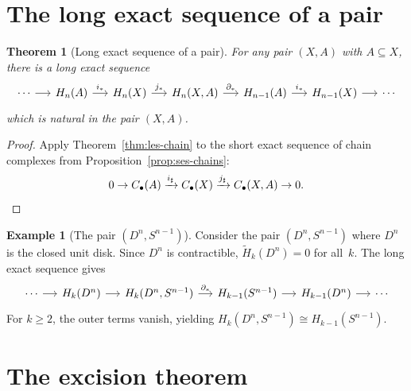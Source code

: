 \documentclass[12pt,a4paper,openany]{book}
\theoremstyle{definition}
\newtheorem{example}[definition]{Example}
\theoremstyle{plain}
\newtheorem{theorem}[definition]{Theorem}
\theoremstyle{remark}
\begin{document}
\section{The long exact sequence of a pair}\label{sec:les-pair}

\begin{theorem}[Long exact sequence of a pair]\label{thm:les-pair}
For any pair $(X,A)$ with $A\subseteq X$, there is a long exact sequence
\[
\begin{tikzcd}[column sep=1.4em]
  \cdots \ar[r]
  & H_n(A) \ar[r,"i_*"]
  & H_n(X) \ar[r,"j_*"]
  & H_n(X,A) \ar[r,"\partial_*"]
  & H_{n-1}(A) \ar[r,"i_*"]
  & H_{n-1}(X) \ar[r]
  & \cdots
\end{tikzcd}
\]
which is natural in the pair $(X,A)$.
\end{theorem}

\begin{proof}
Apply Theorem~\ref{thm:les-chain} to the short exact sequence of
chain complexes from Proposition~\ref{prop:ses-chains}:
\[
  0\to C_\bullet(A)\xrightarrow{i_\sharp}
  C_\bullet(X)\xrightarrow{j_\sharp}
  C_\bullet(X,A)\to 0. \qedhere
\]
\end{proof}

\begin{example}[The pair $(D^n,S^{n-1})$]\label{ex:pair-disk-sphere}
Consider the pair $(D^n,S^{n-1})$ where $D^n$ is the closed unit disk.
Since $D^n$ is contractible, $\widetilde{H}_k(D^n)=0$ for all~$k$.
The long exact sequence gives
\[
\begin{tikzcd}[column sep=1.3em]
  \cdots \ar[r]
  & H_k(D^n) \ar[r]
  & H_k(D^n,S^{n-1}) \ar[r,"\partial_*"]
  & H_{k-1}(S^{n-1}) \ar[r]
  & H_{k-1}(D^n) \ar[r]
  & \cdots
\end{tikzcd}
\]
For $k\ge 2$, the outer terms vanish, yielding
$H_k(D^n,S^{n-1})\cong H_{k-1}(S^{n-1})$.
\end{example}

\section{The excision theorem}\label{sec:excision}
\end{document}

